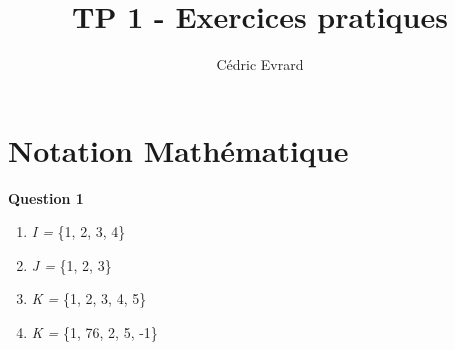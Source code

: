 \documentclass[11pt]{article}
\title{TP 1 - Exercices pratiques}
\author{Cédric Evrard}
\begin{document}
\maketitle
\section{Notation Mathématique}
\textbf{Question 1}
\begin{enumerate}
\item \textit{I =} \{1, 2, 3, 4\}
\item \textit{J =} \{1, 2, 3\} 
\item \textit{K =} \{1, 2, 3, 4, 5\}
\item \textit{K =} \{1, 76, 2, 5, -1\} 
\end{enumerate}
\end{document}
